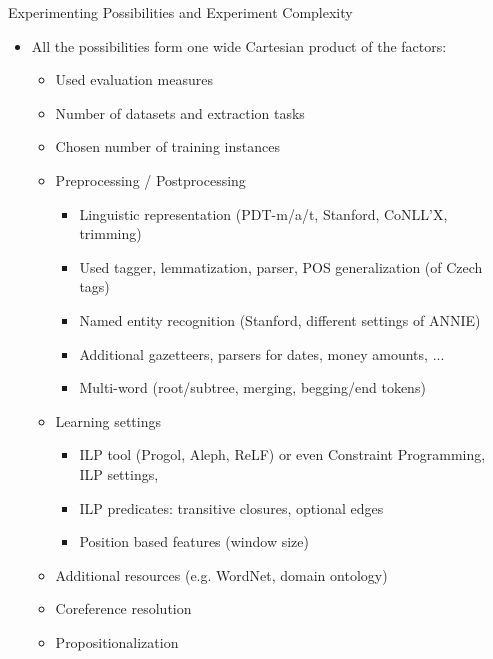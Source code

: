 \documentclass[xcolor=dvipsnames]{beamer}
\begin{document}
\begin{frame}{Experimenting Possibilities and Experiment Complexity}
\label{future_experiments}
\begin{itemize}
	\item All the possibilities form one wide \alert{Cartesian product} of the factors:
	\begin{itemize}
		\item Used evaluation measures
		\item Number of datasets and extraction tasks
		\item Chosen number of training instances
		
		\item Preprocessing / Postprocessing
		\begin{itemize}
			\item Linguistic representation (PDT-m/a/t, Stanford, CoNLL’X, trimming)
			\item Used tagger, lemmatization, parser, POS generalization (of Czech tags)
			\item Named entity recognition (Stanford, different settings of ANNIE)
			\item Additional gazetteers, parsers for dates, money amounts, ...
			\item Multi-word (root/subtree, merging, begging/end tokens)
		\end{itemize}
		
		\item Learning settings
		\begin{itemize}
			\item ILP tool (Progol, Aleph, ReLF) or even Constraint Programming, ILP settings, 
			\item ILP predicates: transitive closures, optional edges
			\item Position based features (window size)
		\end{itemize}
		\bigskip
		\item Additional resources (e.g. WordNet, domain ontology)
		\item Coreference resolution
		\item Propositionalization
	\end{itemize}
\end{itemize}
\end{frame}
\resetcolor
\end{document}
